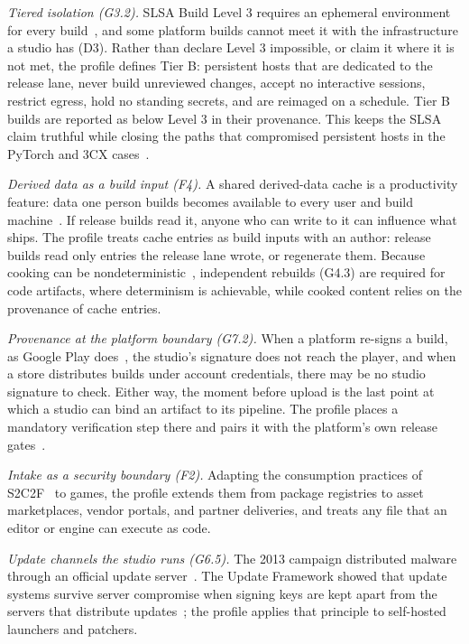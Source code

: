 \documentclass[acmsmall,screen,review]{acmart}
\begin{document}
\emph{Tiered isolation (G3.2).} SLSA Build Level 3 requires an ephemeral environment for every build~\cite{openndslsa}, and some platform builds cannot meet it with the infrastructure a studio has (D3). Rather than declare Level 3 impossible, or claim it where it is not met, the profile defines Tier B: persistent hosts that are dedicated to the release lane, never build unreviewed changes, accept no interactive sessions, restrict egress, hold no standing secrets, and are reimaged on a schedule. Tier B builds are reported as below Level 3 in their provenance. This keeps the SLSA claim truthful while closing the paths that compromised persistent hosts in the PyTorch and 3CX cases~\cite{mandiant20233cx,stawinski2024playing}.

\emph{Derived data as a build input (F4).} A shared derived-data cache is a productivity feature: data one person builds becomes available to every user and build machine~\cite{epicndusing}. If release builds read it, anyone who can write to it can influence what ships. The profile treats cache entries as build inputs with an author: release builds read only entries the release lane wrote, or regenerate them. Because cooking can be nondeterministic~\cite{epicndc}, independent rebuilds (G4.3) are required for code artifacts, where determinism is achievable, while cooked content relies on the provenance of cache entries.

\emph{Provenance at the platform boundary (G7.2).} When a platform re-signs a build, as Google Play does~\cite{googlenduse}, the studio's signature does not reach the player, and when a store distributes builds under account credentials, there may be no studio signature to check. Either way, the moment before upload is the last point at which a studio can bind an artifact to its pipeline. The profile places a mandatory verification step there and pairs it with the platform's own release gates~\cite{valvenduploading}.

\emph{Intake as a security boundary (F2).} Adapting the consumption practices of S2C2F~\cite{openndsecure} to games, the profile extends them from package registries to asset marketplaces, vendor portals, and partner deliveries, and treats any file that an editor or engine can execute as code.

\emph{Update channels the studio runs (G6.5).} The 2013 campaign distributed malware through an official update server~\cite{kaspersky2013winnti}. The Update Framework showed that update systems survive server compromise when signing keys are kept apart from the servers that distribute updates~\cite{samuel2010survivable}; the profile applies that principle to self-hosted launchers and patchers.
\end{document}
